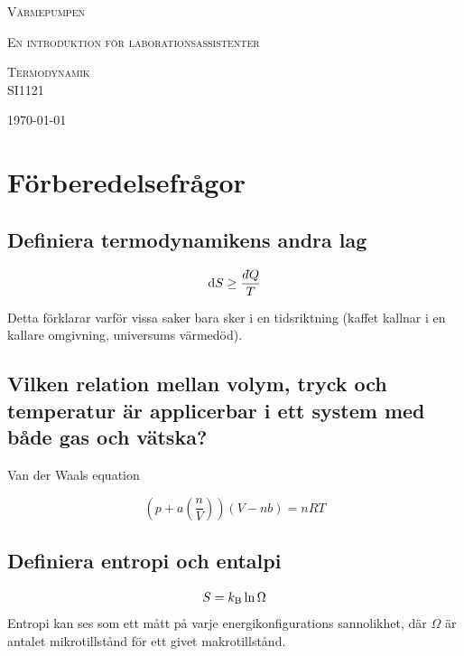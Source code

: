 \documentclass[11pt]{article}
\newcommand{\dbar}{d\hspace*{-0.08em}\bar{}\hspace*{0.1em}}
\begin{document}
\begin{titlepage}
	\centering
	{\scshape\LARGE Värmepumpen \par}
	{\scshape En introduktion för laborationsassistenter \par}
	\vspace{4cm}
	{\scshape\Large Termodynamik \\ SI1121\par}
	\vspace{2cm}
	\vfill
	{\large \today\par}
\end{titlepage}

\section{Förberedelsefrågor}

\subsection{Definiera termodynamikens andra lag}

\begin{equation}
    \mathrm{d}S \geq \frac{\dbar Q}{T}
\end{equation}

Detta förklarar varför vissa saker bara sker i en tidsriktning (kaffet kallnar i en kallare omgivning, universums värmedöd).

\subsection{Vilken relation mellan volym, tryck och temperatur är applicerbar i ett system med både gas och vätska?}

Van der Waals equation

\begin{equation}
    \left ( p + a \left ( \frac{n}{V} \right ) \right ) (V - nb) = nRT
\end{equation}


\subsection{Definiera entropi och entalpi}

\begin{equation}
    S = k_\text B \ln \Omega
\end{equation}
Entropi kan ses som ett mått på varje energikonfigurations sannolikhet, där $\Omega$ är antalet mikrotillstånd för ett givet makrotillstånd.
\end{document}
